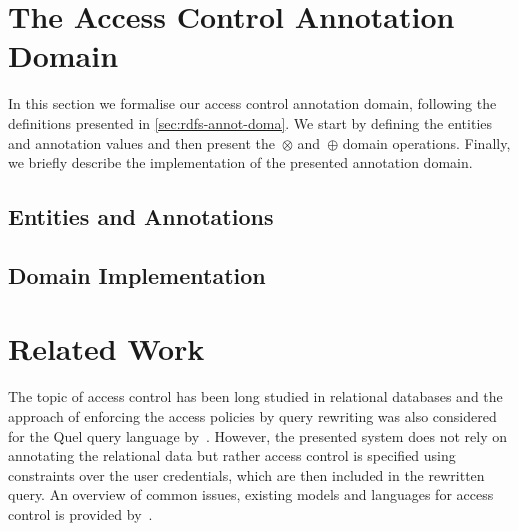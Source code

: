 \section{The Access Control Annotation Domain}
\label{sec:access-contr-doma}

In this section we formalise our access control annotation domain, following the definitions presented in
\cref{sec:rdfs-annot-doma}.  We start by defining the entities and annotation values and then present the~$\otimes$
and~$\oplus$ domain operations. Finally, we briefly describe the implementation of the presented annotation domain.


\subsection{Entities and Annotations}
\label{sec:modell-access-contr}




\subsection{Domain Implementation}
\label{sec:impl-annot-doma}








\section{Related Work}
\label{sec:related-work}

\begin{comment}
  The use of partially ordered sets for access control has previously been considered in the domain of information flow
  in computer systems, mostly in response to the introduction of multi-user systems~\cite{Denning:1976aa}.  Although
  focusing on the question of information passing between arbitrary objects of a computer system (e.g.\ programs,
  processes or files), each process also includes a \emph{clearance class} that limits the security classes the process
  can read and write.
\end{comment}


The topic of access control has been long studied in relational databases and the approach of enforcing the access
policies by query rewriting was also considered for the Quel query language by~\citet{StonebrakerWong:1974aa}.  However,
the presented system does not rely on annotating the relational data but rather access control is specified using
constraints over the user credentials, which are then included in the rewritten query.
%
An overview of common issues, existing models and languages for access control is provided
by~\citet{VimercatiSamaratiJajodia:2005aa}.  


